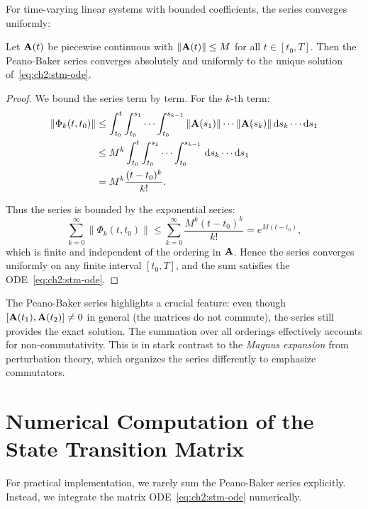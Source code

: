 For time-varying linear systems with bounded coefficients, the series converges uniformly:

\begin{proposition}
\label{prop:ch2:pb-convergence}
Let $\mathbf{A}(t)$ be piecewise continuous with $\|\mathbf{A}(t)\| \leq M$ for all $t\in[t_0,T]$.
Then the Peano-Baker series converges absolutely and uniformly to the unique solution of~\eqref{eq:ch2:stm-ode}.
\end{proposition}

\begin{proof}
We bound the series term by term. For the $k$-th term:
\begin{align}
\|\Phi_k(t,t_0)\| &\leq \int_{t_0}^{t}\int_{t_0}^{s_1}\cdots\int_{t_0}^{s_{k-1}}\|\mathbf{A}(s_1)\|\cdots\|\mathbf{A}(s_k)\|\,\mathrm{d} s_k\cdots\mathrm{d} s_1\\
&\leq M^k \int_{t_0}^{t}\int_{t_0}^{s_1}\cdots\int_{t_0}^{s_{k-1}}\,\mathrm{d} s_k\cdots\mathrm{d} s_1\\
&= M^k \frac{(t-t_0)^k}{k!}.
\end{align}

Thus the series is bounded by the exponential series:
\[
\sum_{k=0}^{\infty}\|\Phi_k(t,t_0)\| \leq \sum_{k=0}^{\infty}\frac{M^k(t-t_0)^k}{k!} = e^{M(t-t_0)},
\]
which is finite and independent of the ordering in $\mathbf{A}$. Hence the series converges uniformly
on any finite interval $[t_0,T]$, and the sum satisfies the ODE~\eqref{eq:ch2:stm-ode}.
\end{proof}

\begin{remark}
The Peano-Baker series highlights a crucial feature: even though $[\mathbf{A}(t_1),\mathbf{A}(t_2)]
\neq 0$ in general (the matrices do not commute), the series still provides the exact solution.
The summation over all orderings effectively accounts for non-commutativity. This is in stark
contrast to the \emph{Magnus expansion} from perturbation theory, which organizes the series
differently to emphasize commutators.
\end{remark}


\section{Numerical Computation of the State Transition Matrix}

For practical implementation, we rarely sum the Peano-Baker series explicitly. Instead, we
integrate the matrix ODE~\eqref{eq:ch2:stm-ode} numerically.

